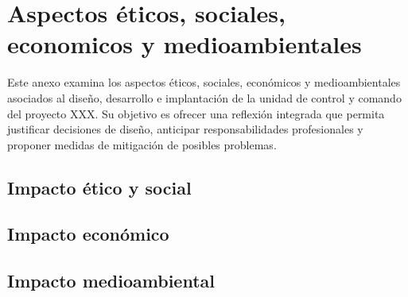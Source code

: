 \chapter{Aspectos éticos, sociales, economicos y medioambientales}
\label{chap:EESE}

Este anexo examina los aspectos éticos, sociales, económicos y medioambientales asociados al diseño, desarrollo e implantación de la unidad de control y comando del proyecto XXX. Su objetivo es ofrecer una reflexión integrada que permita justificar decisiones de diseño, anticipar responsabilidades profesionales y proponer medidas de mitigación de posibles problemas.

\section{Impacto ético y social}


\section{Impacto económico}

\section{Impacto medioambiental}

